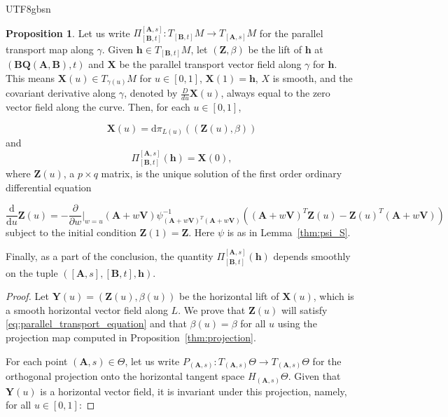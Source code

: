 \documentclass[12pt]{report}
\newcommand{\bracket}[1]{\left ( #1 \right )}
\theoremstyle{plain}
\theoremstyle{definition}
\newtheorem{proposition}[theorem]{Proposition}
\begin{document}
\begin{CJK*}{UTF8}{gbsn}
\begin{proposition}
Let us write $\Pi_{[\bm{B}, t]}^{[\bm{A},s]}: T_{[\bm{B}, t]}M \to T_{[\bm{A},s]}M$
for the parallel transport map along $\gamma$.
Given $\bm{h} \in T_{[\bm{B}, t]}M$,
let $(\bm{Z}, \beta)$ be the lift of $\bm{h}$ at $(\bm{B}\bm{Q}(\bm{A},\bm{B}), t)$
and $\bm{X}$ be the
parallel transport vector field along $\gamma$ for $\bm{h}$.
This means $\bm{X}(u) \in T_{\gamma(u)}M$ for $u \in [0,1]$,
$\bm{X}(1) = \bm{h}$, $X$ is smooth, and the covariant derivative along 
$\gamma$, denoted by $\frac{D}{du} \bm{X}(u)$, always equal to 
the zero vector field along the curve.
Then, for each $u \in [0,1]$,

\begin{equation}\label{eq:parallel_transport_X_formula}
  \bm{X}(u) = \mathrm{d} \pi_{L(u)}
  \bracket{(\bm{Z}(u), \beta)}
\end{equation}
and 
\begin{equation*}
  \Pi_{[\bm{B}, t]}^{[\bm{A},s]}(\bm{h}) = \bm{X}(0),
\end{equation*}
where $\bm{Z}(u)$, a $p \times q$ matrix, 
is the unique solution of the first order 
ordinary differential equation 

\begin{equation}\label{eq:parallel_transport_equation}
  \frac{\mathrm{d}}{\mathrm{d} u} \bm{Z}(u)
  = - \frac{\partial}{\partial w}\biggr |_{w=u} 
  (\bm{A}+w\bm{V})\psi^{-1}_{(\bm{A}+w\bm{V})^T(\bm{A}+w\bm{V})}
\bracket{(\bm{A}+w\bm{V})^T\bm{Z}(u) - \bm{Z}(u)^T(\bm{A}+w\bm{V})}
\end{equation}
subject to the initial condition $\bm{Z}(1) = \bm{Z}$.
Here $\psi$ is as in Lemma~\ref{thm:psi_S}.

Finally, as a part of the conclusion, the quantity 
$\Pi_{[\bm{B}, t]}^{[\bm{A},s]}(\bm{h})$ depends smoothly on 
the tuple $([\bm{A},s], [\bm{B}, t], \bm{h})$.
\end{proposition}

\begin{proof}
Let $\bm{Y}(u) = (\bm{Z}(u), \beta(u))$ be the horizontal lift of $\bm{X}(u)$,
which is a smooth horizontal vector field along $L$.
We prove that $\bm{Z}(u)$ will satisfy \eqref{eq:parallel_transport_equation}
and that $\beta(u) = \beta$ for all $u$
using the projection map computed in Proposition~\ref{thm:projection}.

For each point $(\bm{A},s) \in \Theta$, let us write
$P_{(\bm{A},s)}:T_{(\bm{A},s)}\Theta \to T_{(\bm{A},s)}\Theta$
for the orthogonal projection onto the horizontal tangent space 
$H_{(\bm{A},s)}\Theta$.
Given that $\bm{Y}(u)$ is a horizontal vector field, 
it is invariant under this projection, namely, for all $u \in [0,1]$:


\end{proof}
\end{CJK*}
\end{document}
